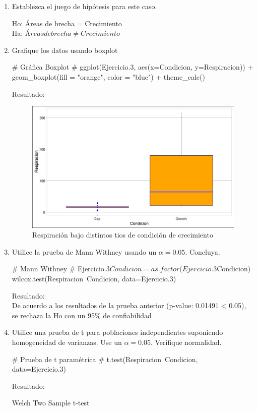 \documentclass[a4paper,12pt]{article} %
\begin{document}
\begin{enumerate} [label=\textbf{\alph*})]
\item Establezca el juego de hipótesis para este caso.
\begin{center}
	Ho: Áreas de brecha = Crecimiento\\
	Ha: \(Áreas de brecha \neq Crecimiento\)
\end{center}
\item Grafique los datos usando boxplot
\begin{MyVerbatim}
	# Gráfica Boxplot #
ggplot(Ejercicio.3, aes(x=Condicion, y=Respiracion)) 
+ geom_boxplot(fill = "orange", color = "blue") 
+ theme_calc()
\end{MyVerbatim}
Resultado: 
\begin{figure} [H]
	\centering
	\includegraphics[width=0.7\linewidth]{condic}
	\caption{Respiración bajo distintos tios de condición de crecimiento}
	\label{fig:condic}
\end{figure}
\item Utilice la prueba de Mann Withney usando un  \( \alpha = 0.05 \). Concluya.
\begin{MyVerbatim}
	# Mann Withney #
Ejercicio.3$Condicion=as.factor(Ejercicio.3$Condicion)
wilcox.test(Respiracion~Condicion, data=Ejercicio.3)
\end{MyVerbatim}
Resultado:\\ 
De acuerdo a los resultados de la prueba anterior (p-value: 0.01491 < 0.05), se rechaza la Ho con un 95\% de confiabilidad
\item Utilice una prueba de t para poblaciones independientes suponiendo homogeneidad de varianzas. Use un \(\alpha=0.05\). Verifique normalidad.
\begin{MyVerbatim}
	# Prueba de t paramétrica #
t.test(Respiracion~Condicion, data=Ejercicio.3)
\end{MyVerbatim}
Resultado:\\
\begin{MyVerbatim}
	Welch Two Sample t-test


\end{MyVerbatim}
\end{enumerate}
\end{document}
